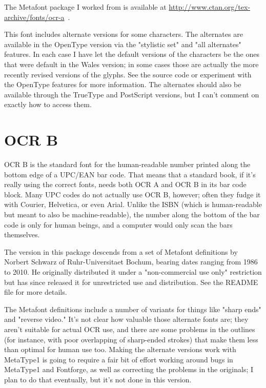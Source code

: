 \documentclass{article}
\begin{document}
The Metafont package I worked from is available at
\url{http://www.ctan.org/tex-archive/fonts/ocr-a}~.

This font includes alternate versions for some characters.  The alternates
are available in the OpenType version via the "stylistic set" and "all
alternates" features.  In each case I have let the default versions of the
characters be the ones that were default in the Wales version; in some cases
those are actually the more recently revised versions of the glyphs.  See
the source code or experiment with the OpenType features for more
information.  The alternates should also be available through the TrueType
and PostScript versions, but I can't comment on exactly how to access them.

\setmainfont{OCRB.otf}
\setmonofont{OCRB.otf}
\section{OCR B}

OCR B is the standard font for the human-readable number printed along the
bottom edge of a UPC/EAN bar code.  That means that a standard book, if it's
really using the correct fonts, needs both OCR A and OCR B in its bar code
block.  Many UPC codes do not actually use OCR B, however; often they fudge
it with Courier, Helvetica, or even Arial.  Unlike the ISBN (which is
human-readable but meant to also be machine-readable), the number
along the bottom of the bar code is only for human beings, and a computer
would only scan the bars themselves.

The version in this package descends from a set of Metafont definitions by
Norbert Schwarz of Ruhr-Universitaet Bochum, bearing dates ranging from 1986
to 2010.  He originally distributed it under a "non-commercial use only"
restriction but has since released it for unrestricted use and distribution. 
See the README file for more details.

The Metafont definitions include a number of variants for things like
"sharp ends" and "reverse video." It's not clear how valuable those
alternate fonts are; they aren't suitable for actual OCR use, and there are
some problems in the outlines (for instance, with poor overlapping of
sharp-ended strokes) that make them less than optimal for human use too. 
Making the alternate versions work with MetaType1 is going to require a fair
bit of effort working around bugs in MetaType1 and Fontforge, as well as
correcting the problems in the originals; I plan to do that eventually, but
it's not done in this version.
\end{document}
